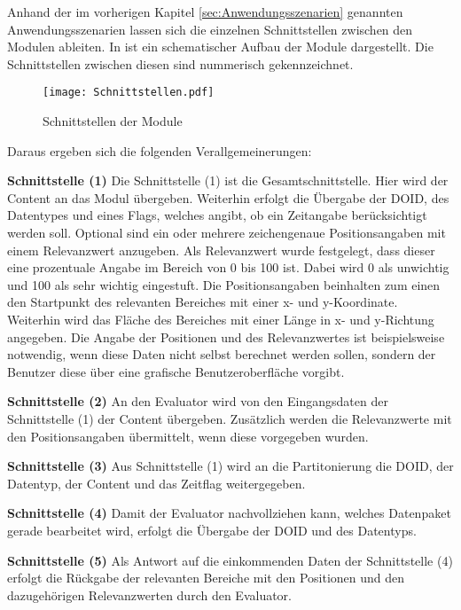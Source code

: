 Anhand der im vorherigen Kapitel \ref{sec:Anwendungsszenarien} genannten Anwendungsszenarien lassen
sich die einzelnen Schnittstellen zwischen den Modulen ableiten. In
 ist ein schematischer Aufbau der Module
dargestellt. Die Schnittstellen zwischen diesen sind nummerisch gekennzeichnet.

\begin{figure}[H]
\centering
\texttt{[image: Schnittstellen.pdf]}
\caption{Schnittstellen der Module}
\label{fig:Schnittstellen}
\end{figure}

Daraus ergeben sich die folgenden Verallgemeinerungen:

\textbf{Schnittstelle (1)}\newline
Die Schnittstelle (1) ist die Gesamtschnittstelle. Hier wird der
Content an das Modul übergeben. Weiterhin erfolgt die Übergabe der DOID, des
Datentypes und eines Flags, welches angibt, ob ein Zeitangabe berücksichtigt
werden soll.
Optional sind ein oder mehrere zeichengenaue Positionsangaben mit einem
Relevanzwert anzugeben. Als Relevanzwert wurde festgelegt, dass dieser eine
prozentuale Angabe im Bereich von 0 bis 100 ist. Dabei wird 0 als unwichtig und
100 als sehr wichtig eingestuft. Die Positionsangaben beinhalten zum einen den
Startpunkt des relevanten Bereiches mit einer x- und y-Koordinate. Weiterhin
wird das Fläche des Bereiches mit einer Länge in x- und y-Richtung angegeben.
Die Angabe der Positionen und des Relevanzwertes ist beispielsweise notwendig,
wenn diese Daten nicht selbst berechnet werden sollen, sondern der Benutzer
diese über eine grafische Benutzeroberfläche vorgibt.

\textbf{Schnittstelle (2)} \newline
An den Evaluator wird von den Eingangsdaten der Schnittstelle (1)
der Content übergeben. Zusätzlich werden die Relevanzwerte mit den
Positionsangaben übermittelt, wenn diese vorgegeben wurden.

\textbf{Schnittstelle (3)} \newline
Aus Schnittstelle (1) wird an die Partitonierung
die DOID, der Datentyp, der Content und das Zeitflag weitergegeben.

\textbf{Schnittstelle (4)} \newline
Damit der Evaluator nachvollziehen kann, welches Datenpaket gerade bearbeitet
wird, erfolgt die Übergabe der DOID und des Datentyps.  

\textbf{Schnittstelle (5)} \newline
Als Antwort auf die einkommenden Daten der Schnittstelle (4)
erfolgt die Rückgabe der relevanten Bereiche mit den Positionen und den
dazugehörigen Relevanzwerten durch den Evaluator.

